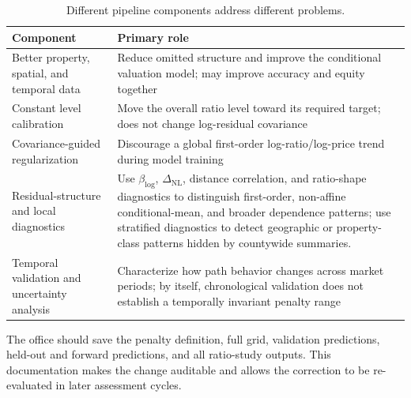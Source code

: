 \documentclass[10pt]{article}
\theoremstyle{definition}
\newcommand{\1}{\mathbf{1}}
\newcommand{\oldtext}[1]{\textcolor{blue}{\sout{#1}}}
\newcommand{\newtext}[1]{\textcolor{impGreen}{#1}}
\newcommand{\latesttext}[1]{\textcolor{latestPurple}{#1}}
\begin{document}
\begin{table}[t]
\centering
\caption{Different pipeline components address different problems.}
\label{tab:roles}
\begin{tabular}{p{4.2cm}p{10.0cm}}
\toprule
Component & Primary role \\
\midrule
Better property, spatial, and temporal data & Reduce omitted structure and improve the conditional valuation model; may improve accuracy and equity together \\
Constant level calibration & Move the overall ratio level toward its required target; does not change log-residual covariance \\
Covariance-guided regularization & Discourage a global first-order log-ratio/log-price trend during model training \\
\newtext{Residual-structure and local diagnostics} & \newtext{Use $\beta_{\log}$, $\Delta_{\mathrm{NL}}$, distance correlation, and ratio-shape diagnostics to distinguish first-order, non-affine conditional-mean, and broader dependence patterns; use stratified diagnostics to detect geographic or property-class patterns hidden by countywide summaries.} \\
\latesttext{Temporal validation and uncertainty analysis} & \latesttext{Characterize how path behavior changes across market periods; by itself, chronological validation does not establish a temporally invariant penalty range} \\
\bottomrule
\end{tabular}
\end{table}

The office should save the penalty definition, full grid, validation predictions, held-out and forward predictions, and all ratio-study outputs. This documentation makes the change auditable and allows the correction to be re-evaluated in later assessment cycles.
\end{document}
